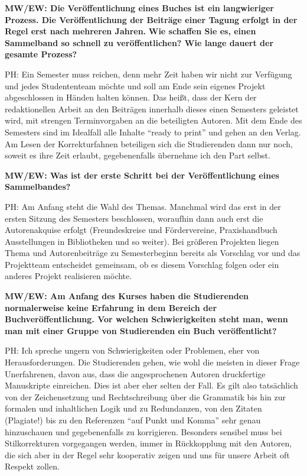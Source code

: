 \documentclass[a4paper,
fontsize=11pt,
oneside,
numbers=noperiodatend,
parskip=half-,
bibliography=totoc,
final
]{scrartcl}
\begin{document}
\textbf{MW/EW: Die Veröffentlichung eines Buches ist ein langwieriger
Prozess. Die Veröffentlichung der Beiträge einer Tagung erfolgt in der
Regel erst nach mehreren Jahren.} \textbf{Wie schaffen Sie es, einen
Sammelband so schnell zu veröffentlichen? Wie lange dauert der gesamte
Prozess?}

PH: Ein Semester muss reichen, denn mehr Zeit haben wir nicht zur
Verfügung und jedes Studententeam möchte und soll am Ende sein eigenes
Projekt abgeschlossen in Händen halten können. Das heißt, dass der Kern
der redaktionellen Arbeit an den Beiträgen innerhalb dieses einen
Semesters geleistet wird, mit strengen Terminvorgaben an die beteiligten
Autoren. Mit dem Ende des Semesters sind im Idealfall alle Inhalte
\enquote{ready to print} und gehen an den Verlag. Am Lesen der
Korrekturfahnen beteiligen sich die Studierenden dann nur noch, soweit
es ihre Zeit erlaubt, gegebenenfalls übernehme ich den Part selbst.

\textbf{MW/EW: Was ist der erste Schritt bei der Veröffentlichung eines
Sammelbandes?}

PH: Am Anfang steht die Wahl des Themas. Manchmal wird das erst in der
ersten Sitzung des Semesters beschlossen, woraufhin dann auch erst die
Autorenakquise erfolgt (Freundeskreise und Fördervereine, Praxishandbuch
Ausstellungen in Bibliotheken und so weiter). Bei größeren Projekten
liegen Thema und Autorenbeiträge zu Semesterbeginn bereits als Vorschlag
vor und das Projektteam entscheidet gemeinsam, ob es diesem Vorschlag
folgen oder ein anderes Projekt realisieren möchte.

\textbf{MW/EW: Am Anfang des Kurses haben die Studierenden normalerweise
keine Erfahrung in dem Bereich der Buchveröffentlichung. Vor welchen
Schwierigkeiten steht man, wenn man mit einer Gruppe von Studierenden
ein Buch veröffentlicht?}

PH: Ich spreche ungern von Schwierigkeiten oder Problemen, eher von
Herausforderungen. Die Studierenden gehen, wie wohl die meisten in
dieser Frage Unerfahrenen, davon aus, dass die angesprochenen Autoren
druckfertige Manuskripte einreichen. Dies ist aber eher selten der Fall.
Es gilt also tatsächlich von der Zeichensetzung und Rechtschreibung über
die Grammatik bis hin zur formalen und inhaltlichen Logik und zu
Redundanzen, von den Zitaten (Plagiate!) bis zu den Referenzen
\enquote{auf Punkt und Komma} sehr genau hinzuschauen und gegebenenfalls
zu korrigieren. Besonders sensibel muss bei Stilkorrekturen vorgegangen
werden, immer in Rückkopplung mit den Autoren, die sich aber in der
Regel sehr kooperativ zeigen und uns für unsere Arbeit oft Respekt
zollen.
\end{document}
